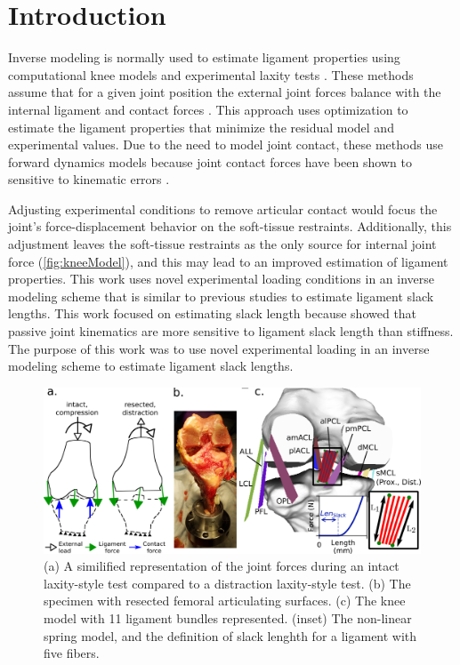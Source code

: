 \label{InverseModeling}
\section{Introduction}
Inverse modeling is normally used to estimate ligament properties using computational knee models and experimental laxity tests \citep{blankevoort_validation_1996,baldwin_dynamic_2012,ewing_estimating_2015,harris_combined_2016}. These methods assume that for a given joint position the external joint forces balance with the internal ligament and contact forces \citep{blankevoort_validation_1996}. This approach uses optimization to estimate the ligament properties that minimize the residual model and experimental values. Due to the need to model joint contact, these methods use forward dynamics models because joint contact forces have been shown to sensitive to kinematic errors \citep{fregly_sensitivity_2008,yao_sensitivity_2008}.

Adjusting experimental conditions to remove articular contact would focus the joint's force-displacement behavior on the soft-tissue restraints. Additionally, this adjustment leaves the soft-tissue restraints as the only source for internal joint force (\autoref{fig:kneeModel}), and this may lead to an improved estimation of ligament properties. This work uses novel experimental loading conditions in an inverse modeling scheme that is similar to previous studies \citep{blankevoort_validation_1996,baldwin_dynamic_2012,ewing_estimating_2015,harris_combined_2016} to estimate ligament slack lengths. This work focused on estimating slack length because \cite{baldwin_efficient_2009} showed that passive joint kinematics are more sensitive to ligament slack length than stiffness. The purpose of this work was to use novel experimental loading in an inverse modeling scheme to estimate ligament slack lengths. 

\begin{figure}
    \centering
    \includegraphics[width=0.85\linewidth]{../img/TwoColumnFig.png}
    \caption{(a) A similified representation of the joint forces during an intact laxity-style test compared to a distraction laxity-style test. (b) The specimen with resected femoral articulating surfaces. (c) The knee model with 11 ligament bundles represented. (inset) The non-linear spring model, and the definition of slack lenghth for a ligament with five fibers.}
    \label{fig:kneeModel}
\end{figure}

